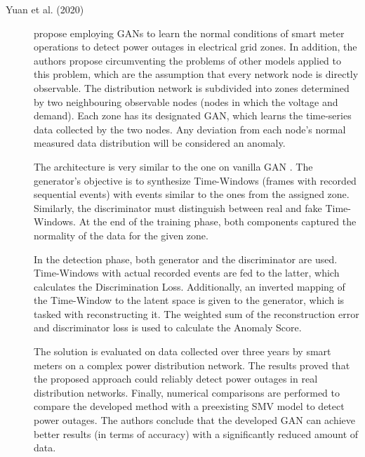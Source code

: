 \begin{description}
    \item[Yuan et al. (2020) \cite{yuan.etal_OutageDetectionPartially_2020}] propose employing GANs to learn the normal conditions of smart meter operations to detect power outages in electrical grid zones. In addition, the authors propose circumventing the problems of other models applied to this problem, which are the assumption that every network node is directly observable. The distribution network is subdivided into zones determined by two neighbouring observable nodes (nodes in which the voltage and demand). Each zone has its designated GAN, which learns the time-series data collected by the two nodes. Any deviation from each node's normal measured data distribution will be considered an anomaly.

    The architecture is very similar to the one on vanilla GAN \cite{goodfellow.etal_GenerativeAdversarialNets_}. The generator's objective is to synthesize Time-Windows (frames with recorded sequential events) with events similar to the ones from the assigned zone. Similarly, the discriminator must distinguish between real and fake Time-Windows. At the end of the training phase, both components captured the normality of the data for the given zone.

    In the detection phase, both generator and the discriminator are used. Time-Windows with actual recorded events are fed to the latter, which calculates the Discrimination Loss. Additionally, an inverted mapping of the Time-Window to the latent space is given to the generator, which is tasked with reconstructing it. The weighted sum of the reconstruction error and discriminator loss is used to calculate the Anomaly Score.

    The solution is evaluated on data collected over three years by smart meters on a complex power distribution network. The results proved that the proposed approach could reliably detect power outages in real distribution networks. Finally, numerical comparisons are performed to compare the developed method with a preexisting SMV model to detect power outages. The authors conclude that the developed GAN can achieve better results (in terms of accuracy) with a significantly reduced amount of data.
\end{description}

